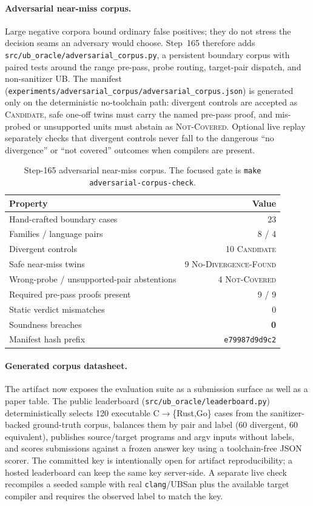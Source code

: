 \documentclass[10pt,a4paper]{article}
\begin{document}
\paragraph{Adversarial near-miss corpus.}
Large negative corpora bound ordinary false positives; they do not stress the
decision seams an adversary would choose.  Step~165 therefore adds
\texttt{src/ub\_oracle/adversarial\_corpus.py}, a persistent boundary corpus with
paired tests around the range pre-pass, probe routing, target-pair dispatch, and
non-sanitizer UB.  The manifest
(\texttt{experiments/adversarial\_corpus/adversarial\_corpus.json}) is generated
only on the deterministic no-toolchain path: divergent controls are accepted as
\textsc{Candidate}, safe one-off twins must carry the named pre-pass proof, and
mis-probed or unsupported units must abstain as \textsc{Not-Covered}.  Optional
live replay separately checks that divergent controls never fall to the dangerous
``no divergence'' or ``not covered'' outcomes when compilers are present.

\begin{table}[t]
\centering
\small
\caption{Step-165 adversarial near-miss corpus.  The focused gate is
\texttt{make adversarial-corpus-check}.}
\label{tab:adversarial-corpus}
\begin{tabular}{@{}lr@{}}
\toprule
Property & Value \\
\midrule
Hand-crafted boundary cases & 23 \\
Families / language pairs & 8 / 4 \\
Divergent controls & 10 \textsc{Candidate} \\
Safe near-miss twins & 9 \textsc{No-Divergence-Found} \\
Wrong-probe / unsupported-pair abstentions & 4 \textsc{Not-Covered} \\
Required pre-pass proofs present & 9 / 9 \\
Static verdict mismatches & 0 \\
Soundness breaches & \textbf{0} \\
Manifest hash prefix & \texttt{e79987d9d9c2} \\
\bottomrule
\end{tabular}
\end{table}

\paragraph{Generated corpus datasheet.}
The artifact now exposes the evaluation suite as a submission surface as well as
a paper table.  The public leaderboard
(\texttt{src/ub\_oracle/leaderboard.py}) deterministically selects 120 executable
C$\to$\{Rust,Go\} cases from the sanitizer-backed ground-truth corpus, balances
them by pair and label (60 divergent, 60 equivalent), publishes source/target
programs and argv inputs without labels, and scores submissions against a frozen
answer key using a toolchain-free JSON scorer.  The committed key is intentionally
open for artifact reproducibility; a hosted leaderboard can keep the same key
server-side.  A separate live check recompiles a seeded sample with real
\texttt{clang}/UBSan plus the available target compiler and requires the observed
label to match the key.
\end{document}
